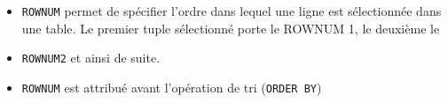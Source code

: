 \documentclass[10pt]{beamer}
\begin{document}
\begin{frame}[allowframebreaks]{\secname}
    
\end{frame}

\begin{frame}{\secname}
    \begin{itemize}
        \item \lstinline[language=plsql]!ROWNUM! permet de spécifier l'ordre dans lequel une ligne est sélectionnée dans une table.  Le premier tuple sélectionné porte le ROWNUM 1, le deuxième le
        \item \lstinline[language=plsql]!ROWNUM2! et ainsi de suite.
        \item \lstinline[language=plsql]!ROWNUM! est attribué avant l'opération de tri (\lstinline[language=plsql]!ORDER BY!)
    \end{itemize}
\end{frame}

\begin{frame}{\secname}
    
\end{frame}

\begin{frame}{\secname}
    
\end{frame}
\end{document}
